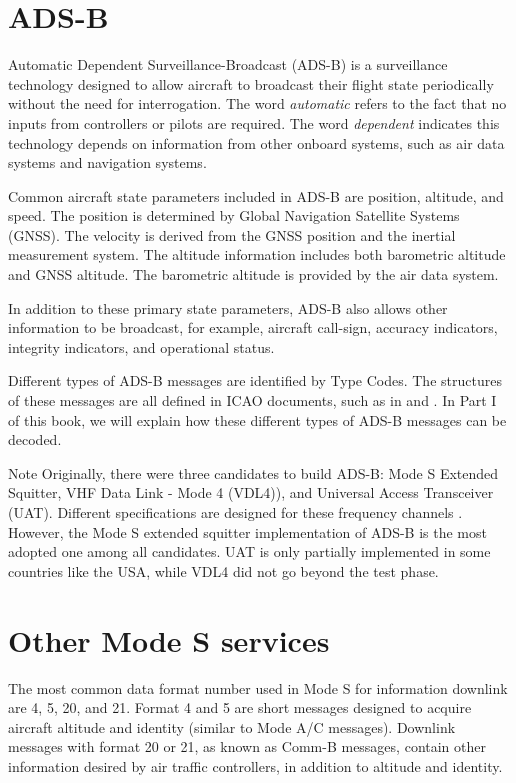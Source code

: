 \section{ADS-B}

Automatic Dependent Surveillance-Broadcast (ADS-B) is a surveillance technology designed to allow aircraft to broadcast their flight state periodically without the need for interrogation. The word \emph{automatic} refers to the fact that no inputs from controllers or pilots are required. The word \emph{dependent} indicates this technology depends on information from other onboard systems, such as air data systems and navigation systems.

Common aircraft state parameters included in ADS-B are position, altitude, and speed. The position is determined by Global Navigation Satellite Systems (GNSS). The velocity is derived from the GNSS position and the inertial measurement system. The altitude information includes both barometric altitude and GNSS altitude. The barometric altitude is provided by the air data system. 

In addition to these primary state parameters, ADS-B also allows other information to be broadcast, for example, aircraft call-sign, accuracy indicators, integrity indicators, and operational status.

Different types of ADS-B messages are identified by Type Codes. The structures of these messages are all defined in ICAO documents, such as in \cite{icao9871v1} and \cite{rtca2011mops}. In Part I of this book, we will explain how these different types of ADS-B messages can be decoded.

\begin{notebox}{Note}
Originally, there were three candidates to build ADS-B: Mode S Extended Squitter, VHF Data Link - Mode 4 (VDL4)), and Universal Access Transceiver (UAT). Different specifications are designed for these frequency channels \cite{rtca2011mops, rtca2002uat}. However, the Mode S extended squitter implementation of ADS-B is the most adopted one among all candidates. UAT is only partially implemented in some countries like the USA, while VDL4 did not go beyond the test phase.
\end{notebox}


\section{Other Mode S services}

The most common data format number used in Mode S for information downlink are 4, 5, 20, and 21. Format 4 and 5 are short messages designed to acquire aircraft altitude and identity (similar to Mode A/C messages). Downlink messages with format 20 or 21, as known as Comm-B messages, contain other information desired by air traffic controllers, in addition to altitude and identity.

